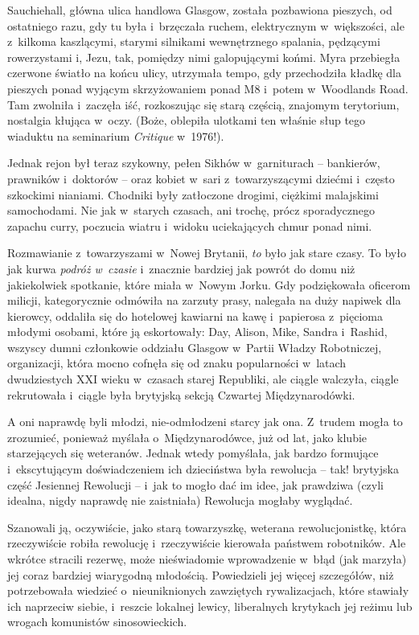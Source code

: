 \documentclass[oneside,polish,11pt,sfheadings]{mwbk}
\begin{document}
Sauchiehall, główna ulica handlowa Glasgow, została pozbawiona pieszych,
od ostatniego razu, gdy tu była i~brzęczała ruchem, elektrycznym w~większości, ale z~kilkoma kaszlącymi, starymi silnikami wewnętrznego
spalania, pędzącymi rowerzystami i, Jezu, tak, pomiędzy nimi
galopującymi końmi. Myra przebiegła czerwone światło na końcu ulicy,
utrzymała tempo, gdy przechodziła kładkę dla pieszych ponad wyjącym
skrzyżowaniem ponad M8 i~potem w~Woodlands Road. Tam zwolniła i~zaczęła
iść, rozkoszując się starą częścią, znajomym terytorium, nostalgia
kłująca w~oczy. (Boże, oblepiła ulotkami ten właśnie słup tego wiaduktu
na seminarium \textit{Critique} w~1976!).

Jednak rejon był teraz szykowny, pełen Sikhów w~garniturach -- bankierów,
prawników i~doktorów -- oraz kobiet w~sari z~towarzyszącymi dziećmi i~często szkockimi nianiami. Chodniki były zatłoczone drogimi, ciężkimi
malajskimi samochodami. Nie jak w~starych czasach, ani trochę, prócz
sporadycznego zapachu curry, poczucia wiatru i~widoku uciekających chmur
ponad nimi.

Rozmawianie z~towarzyszami w~Nowej Brytanii, \textit{to} było jak stare
czasy. To było jak kurwa \textit{podróż w~czasie} i~znacznie bardziej jak
powrót do domu niż jakiekolwiek spotkanie, które miała w~Nowym Jorku.
Gdy podziękowała oficerom milicji, kategorycznie odmówiła na zarzuty
prasy, nalegała na duży napiwek dla kierowcy, oddaliła się do hotelowej
kawiarni na kawę i~papierosa z~pięcioma młodymi osobami, które ją
eskortowały: Day, Alison, Mike, Sandra i~Rashid, wszyscy dumni
członkowie oddziału Glasgow w~Partii Władzy Robotniczej, organizacji,
która mocno cofnęła się od znaku popularności w~latach dwudziestych XXI
wieku w~czasach starej Republiki, ale ciągle walczyła, ciągle
rekrutowała i~ciągle była brytyjską sekcją Czwartej Międzynarodówki.

A oni naprawdę byli młodzi, nie-odmłodzeni starcy jak ona. Z~trudem
mogła to zrozumieć, ponieważ myślała o~Międzynarodówce, już od lat, jako
klubie starzejących się weteranów. Jednak wtedy pomyślała, jak bardzo
formujące i~ekscytującym doświadczeniem ich dzieciństwa była rewolucja -- tak! brytyjska część Jesiennej Rewolucji -- i~jak to mogło dać im idee,
jak prawdziwa (czyli idealna, nigdy naprawdę nie zaistniała) Rewolucja
mogłaby wyglądać.

Szanowali ją, oczywiście, jako starą towarzyszkę, weterana
rewolucjonistkę, która rzeczywiście robiła rewolucję i~rzeczywiście
kierowała państwem robotników. Ale wkrótce stracili rezerwę, może
nieświadomie wprowadzenie w~błąd (jak marzyła) jej coraz bardziej
wiarygodną młodością. Powiedzieli jej więcej szczegółów, niż
potrzebowała wiedzieć o~nieuniknionych zawziętych rywalizacjach, które
stawiały ich naprzeciw siebie, i~reszcie lokalnej lewicy, liberalnych
krytykach jej reżimu lub wrogach komunistów sinosowieckich.
\end{document}
